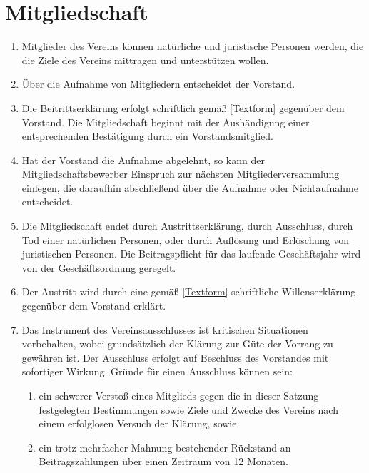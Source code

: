 \documentclass[fontsize=12pt,paper=a4,pagesize,headings=small]{scrartcl}
\begin{document}
\section{Mitgliedschaft}
\begin{enumerate}
    \item Mitglieder des Vereins können natürliche und juristische
    Personen werden, die die Ziele des Vereins mittragen und
    unterstützen wollen.

    \item Über die Aufnahme von Mitgliedern entscheidet der Vorstand.

    \item Die Beitrittserklärung erfolgt schriftlich gemäß
    \ref{Textform} gegenüber dem Vorstand. Die Mitgliedschaft
    beginnt mit der Aushändigung einer entsprechenden Bestätigung durch
    ein Vorstandsmitglied.

    \item Hat der Vorstand die Aufnahme abgelehnt, so kann der
    Mitgliedschaftsbewerber Einspruch zur nächsten
    Mitgliederversammlung einlegen, die daraufhin abschließend über die
    Aufnahme oder Nichtaufnahme entscheidet.

    \item Die Mitgliedschaft endet durch Austrittserklärung, durch
    Ausschluss, durch Tod einer natürlichen Personen, oder durch
    Auflösung und Erlöschung von juristischen Personen. Die
    Beitragspflicht für das laufende Geschäftsjahr wird von der
    Geschäftsordnung geregelt.

    \item Der Austritt wird durch eine gemäß \ref{Textform}
    schriftliche Willenserklärung gegenüber dem Vorstand erklärt.

    \item Das Instrument des Vereinsausschlusses ist kritischen
    Situationen vorbehalten, wobei grundsätzlich der Klärung zur Güte
    der Vorrang zu gewähren ist. Der Ausschluss erfolgt auf Beschluss
    des Vorstandes mit sofortiger Wirkung. Gründe für einen Ausschluss
    können sein:
        \begin{enumerate}
            \item ein schwerer Verstoß eines Mitglieds gegen die in
                dieser Satzung festgelegten Bestimmungen sowie Ziele und
                Zwecke des Vereins nach einem erfolglosen Versuch der
                Klärung, sowie
            \item ein trotz mehrfacher Mahnung bestehender Rückstand an
                Beitragszahlungen über einen Zeitraum von 12 Monaten.
        \end{enumerate}


\end{enumerate}
\end{document}
